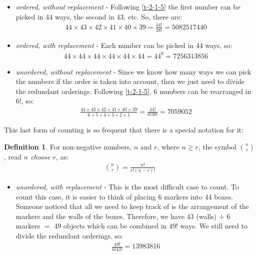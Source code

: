 \documentclass[
  oneside,
  11pt, a4paper,
  footinclude=true,
  headinclude=true,
  cleardoublepage=empty
]{scrbook}
\theoremstyle{definition}
\newtheorem{definition}{Definition}[section]
\theoremstyle{definition}
\begin{document}
        \begin{itemize}
            \item \emph{ordered, without replacement} - Following \ref{t-2-1-5} the first number can be picked in 44 ways, the second in 43, etc. So, there are:
            \begin{align*}
                44 \times 43 \times 42 \times 41 \times 40 \times 39 = \frac{44!}{38!} = 5082517440
            \end{align*}{}
            \item \emph{ordered, with replacement} - Each number can be picked in 44 ways, so:
            \begin{align*}
                44 \times 44 \times 44 \times 44 \times 44 \times 44 = 44^6 = 7256313856
            \end{align*}{}
            \item \emph{unordered, without replacement} - Since we know how many ways we can pick the numbers if the order is taken into account, then we just need to divide the redundant orderings. Following \ref{t-2-1-5}, 6 numbers can be rearranged in $6!$, so:
            \begin{align*}
                \frac{44 \times 43 \times 42 \times 41 \times 40 \times 39}{6 \times 5 \times 4 \times 3 \times 2 \times 1} = \frac{44!}{6!38!} = 7059052
            \end{align*}{}
        \end{itemize}{}
        
        This last form of counting is so frequent that there is a special notation for it:
        
        \begin{definition}{For non-negative numbers, $n$ and $r$, where $n \geq r$, the symbol $\binom{n}{r}$, read \emph{$n$ choose $r$}, as:}
            \begin{align*}
                \binom{n}{r} = \frac{n!}{r!(n-r)!}
            \end{align*}{}
        \end{definition}{}
       \begin{itemize}
            \item \emph{unordered, with replacement} - This is the most difficult case to count. To count this case, it is easier to think of placing 6 markers into 44 boxes. Someone noticed \citep{feller-vol-2} that all we need to keep track of is the arrangement of the markers and the walls of the boxes. Therefore, we have 43 (walls) $+$ 6 markers $=$ 49 objects which can be combined in $49!$ ways. We still need to divide the redundant orderings, so: 
            \begin{align*}
                \frac{49!}{6!43!} = 13983816
            \end{align*}{}
        \end{itemize}{}
        
\end{document}
